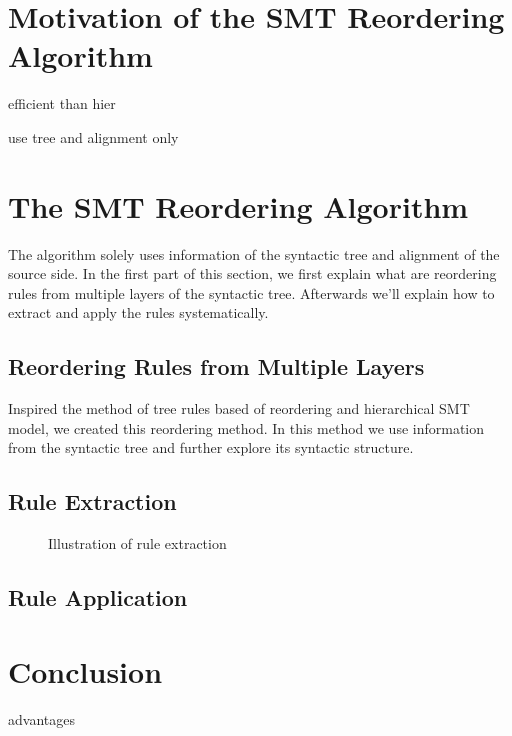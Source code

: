 \section{Motivation of the SMT Reordering Algorithm}
\label{ch:ReorderingApproach:sec:Motivation}




efficient than hier

use tree and alignment only

\section{The SMT Reordering Algorithm}
\label{ch:ReorderingApproach:sec:Algorithm}


The algorithm solely uses information of the syntactic tree and alignment of the source side. In the first part of this section, we first explain what are reordering rules from multiple layers of the syntactic tree. Afterwards we'll explain how to extract and apply the rules systematically.

\subsection{Reordering Rules from Multiple Layers}

Inspired the method of tree rules based of reordering and hierarchical SMT model, we created this reordering method. In this method we use information from the syntactic tree and further explore its syntactic structure. 



\subsection{Rule Extraction}

\begin{figure}[H]
\centering

\caption{Illustration of rule extraction}
\end{figure}





\subsection{Rule Application}

\section{Conclusion}

advantages